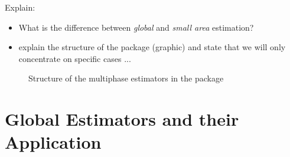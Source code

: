 \documentclass[article]{jss}
\begin{document}
Explain:
\begin{itemize}
  \item What is the difference between \textit{global} and \textit{small area} estimation?
  \item explain the structure of the package (graphic) and state that we will only concentrate on specific cases ...
\end{itemize}


\begin{figure}[htb]
\centering
{}
\caption{Structure of the multiphase estimators in the  package }
\label{fig:struct_package}
\end{figure}




%






\section[Global Estimators and their Application in R]{Global Estimators and their Application}
\label{sec:globest_and_appl}
\end{document}
